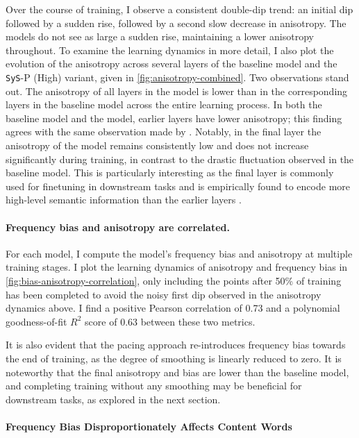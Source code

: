 Over the course of training, I observe a consistent double-dip trend: an initial dip followed by a sudden rise, followed by a second slow decrease in anisotropy. The \smoothing models do not see as large a sudden rise, maintaining a lower anisotropy throughout. To examine the learning dynamics in more detail, I also plot the evolution of the anisotropy across several layers of the baseline model and the \texttt{SyS}-P (High) variant, given in \cref{fig:anisotropy-combined}. Two observations stand out. The anisotropy of all layers in the \smoothing model is lower than in the corresponding layers in the baseline model across the entire learning process. In both the baseline model and the \smoothing model, earlier layers have lower anisotropy; this finding agrees with the same observation made by \citet{ethayarajh2019contextual}. Notably, in the final layer the anisotropy of the \smoothing model remains consistently low and does not increase significantly during training, in contrast to the drastic fluctuation observed in the baseline model. This is particularly interesting as the final layer is commonly used for finetuning in downstream tasks and is empirically found to encode more high-level semantic information than the earlier layers \citep{clark2019does}. 

\paragraph{Frequency bias and anisotropy are correlated.}

For each model, I compute the model's frequency bias and anisotropy at multiple training stages. I plot the learning dynamics of anisotropy and frequency bias in \cref{fig:bias-anisotropy-correlation}, only including the points after 50\% of training has been completed to avoid the noisy first dip observed in the anisotropy dynamics above. I find a positive Pearson correlation of 0.73 and a polynomial goodness-of-fit $R^2$ score of 0.63 between these two metrics.

It is also evident that the pacing approach re-introduces frequency bias towards the end of training, as the degree of smoothing is linearly reduced to zero. It is noteworthy that the final anisotropy and bias are lower than the baseline model, and completing training without any smoothing may be beneficial for downstream tasks, as explored in the next section.

\paragraph{Frequency Bias Disproportionately Affects Content Words}
\label{section:word-class-versus-word-frequency}


